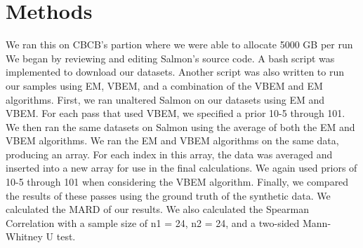 \section{Methods}
We ran this on CBCB’s partion where we were able to allocate 5000 GB per run
We began by reviewing and editing Salmon’s source code. A bash script was implemented to download our datasets. Another script was also written to run our samples using EM, VBEM, and a combination of the VBEM and EM algorithms. 
First, we ran unaltered Salmon on our datasets using EM and VBEM. For each pass that used VBEM, we specified a prior 10-5 through 101. 
We then ran the same datasets on Salmon using the average of both the EM and VBEM algorithms. We ran the EM and VBEM algorithms on the same data, producing an array. For each index in this array, the data was averaged and inserted into a new array for use in the final calculations. We again used priors of 10-5 through 101 when considering the VBEM algorithm. 
Finally, we compared the results of these passes using the ground truth of the synthetic data. We calculated the MARD of our results. We also calculated the Spearman Correlation with a sample size of n1 = 24, n2 = 24, and a two-sided Mann-Whitney U test. 
